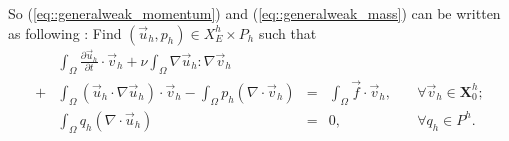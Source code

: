\documentclass[a4paper, 11pt]{article}
\begin{document}
   So (\ref{eq::generalweak_momentum}) and (\ref{eq::generalweak_mass})
    can be written as following : Find
   $(\vec{u}_h, p_h) \in X_E^h \times P_h$ such that
   \begin{equation}
     \begin{aligned}
       &\int_{\Omega}\frac{\partial \vec{u}_h}{\partial t} \cdot \vec{v}_h
       + \nu \int_\Omega \nabla \vec{u}_h : \nabla \vec{v}_h  \\
       + & \int_\Omega \left( \vec{u}_h \cdot \nabla \vec{u}_h \right)
       \cdot \vec{v}_h - \int_\Omega p_h \left( \nabla \cdot \vec{v}_h
       \right) & = &\int_\Omega \vec{f} \cdot \vec{v}_h, &\quad
       \forall \vec{v}_h \in \mathbf{X}_0^h;  \\
       & \int_\Omega q_h \left( \nabla \cdot \vec{u}_h \right) & = &0,&
       \quad \forall q_h \in P^h.
       \label{eq::discreted_weak}
     \end{aligned}
   \end{equation}
\end{document}
